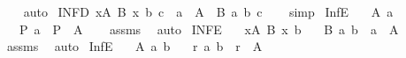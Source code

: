\begin{isabellebody}
%
\isadelimproof
\ \ %
\endisadelimproof
%
\isatagproof
{}\isamarkupfalse%
\ auto%
\endisatagproof
{\isafoldproof}%
%
\isadelimproof
\isanewline
%
\endisadelimproof
\isanewline
{}\isamarkupfalse%
\ INF{}{\isacharunderscore}{\kern0pt}D{\isacharcolon}{\kern0pt}\ {\isachardoublequoteopen}{\isacharparenleft}{\kern0pt}{\isasymSqinter}x{\isasymin}A{\isachardot}{\kern0pt}\ B\ x{\isacharparenright}{\kern0pt}\ b\ c\ {\isasymLongrightarrow}\ a\ {\isasymin}\ A\ {\isasymLongrightarrow}\ B\ a\ b\ c{\isachardoublequoteclose}\isanewline
%
\isadelimproof
\ \ %
\endisadelimproof
%
\isatagproof
{}\isamarkupfalse%
\ simp%
\endisatagproof
{\isafoldproof}%
%
\isadelimproof
\isanewline
%
\endisadelimproof
\isanewline
{}\isamarkupfalse%
\ Inf{}{\isacharunderscore}{\kern0pt}E{\isacharcolon}{\kern0pt}\isanewline
\ \ \ {\isachardoublequoteopen}{\isacharparenleft}{\kern0pt}{\isasymSqinter}A{\isacharparenright}{\kern0pt}\ a{\isachardoublequoteclose}\isanewline
\ \ \ {\isachardoublequoteopen}P\ a{\isachardoublequoteclose}\ {\isacharbar}{\kern0pt}\ {\isachardoublequoteopen}P\ {\isasymnotin}\ A{\isachardoublequoteclose}\isanewline
%
\isadelimproof
\ \ %
\endisadelimproof
%
\isatagproof
{}\isamarkupfalse%
\ assms\ \isamarkupfalse%
\ auto%
\endisatagproof
{\isafoldproof}%
%
\isadelimproof
\isanewline
%
\endisadelimproof
\isanewline
{}\isamarkupfalse%
\ INF{}{\isacharunderscore}{\kern0pt}E{\isacharcolon}{\kern0pt}\isanewline
\ \ \ {\isachardoublequoteopen}{\isacharparenleft}{\kern0pt}{\isasymSqinter}x{\isasymin}A{\isachardot}{\kern0pt}\ B\ x{\isacharparenright}{\kern0pt}\ b{\isachardoublequoteclose}\isanewline
\ \ \ {\isachardoublequoteopen}B\ a\ b{\isachardoublequoteclose}\ {\isacharbar}{\kern0pt}\ {\isachardoublequoteopen}a\ {\isasymnotin}\ A{\isachardoublequoteclose}\isanewline
%
\isadelimproof
\ \ %
\endisadelimproof
%
\isatagproof
{}\isamarkupfalse%
\ assms\ \isamarkupfalse%
\ auto%
\endisatagproof
{\isafoldproof}%
%
\isadelimproof
\isanewline
%
\endisadelimproof
\isanewline
{}\isamarkupfalse%
\ Inf{}{\isacharunderscore}{\kern0pt}E{\isacharcolon}{\kern0pt}\isanewline
\ \ \ {\isachardoublequoteopen}{\isacharparenleft}{\kern0pt}{\isasymSqinter}A{\isacharparenright}{\kern0pt}\ a\ b{\isachardoublequoteclose}\isanewline
\ \ \ {\isachardoublequoteopen}r\ a\ b{\isachardoublequoteclose}\ {\isacharbar}{\kern0pt}\ {\isachardoublequoteopen}r\ {\isasymnotin}\ A{\isachardoublequoteclose}\isanewline

\end{isabellebody}
